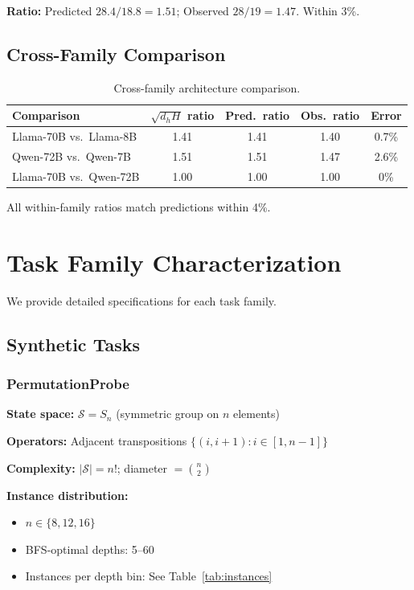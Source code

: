 \documentclass{article}
\theoremstyle{plain}
\theoremstyle{definition}
\theoremstyle{remark}
\begin{document}
\textbf{Ratio:} Predicted $28.4/18.8 = 1.51$; Observed $28/19 = 1.47$. Within 3\%.

\subsection{Cross-Family Comparison}

\begin{table}[h]
\centering
\caption{Cross-family architecture comparison.}
\label{tab:cross_family}
\small
\begin{tabular}{@{}lcccc@{}}
\toprule
\textbf{Comparison} & $\sqrt{d_h H}$ ratio & \textbf{Pred.\ ratio} & \textbf{Obs.\ ratio} & \textbf{Error} \\
\midrule
Llama-70B vs.\ Llama-8B & 1.41 & 1.41 & 1.40 & 0.7\% \\
Qwen-72B vs.\ Qwen-7B & 1.51 & 1.51 & 1.47 & 2.6\% \\
Llama-70B vs.\ Qwen-72B & 1.00 & 1.00 & 1.00 & 0\% \\
\bottomrule
\end{tabular}
\end{table}

All within-family ratios match predictions within 4\%.


\section{Task Family Characterization}
\label{app:task_families}

We provide detailed specifications for each task family.

\subsection{Synthetic Tasks}

\subsubsection{PermutationProbe}

\textbf{State space:} $\mathcal{S} = S_n$ (symmetric group on $n$ elements)

\textbf{Operators:} Adjacent transpositions $\{(i, i+1) : i \in [1, n-1]\}$

\textbf{Complexity:} $|\mathcal{S}| = n!$; diameter $= \binom{n}{2}$

\textbf{Instance distribution:}
\begin{itemize}
\item $n \in \{8, 12, 16\}$
\item BFS-optimal depths: 5--60
\item Instances per depth bin: See Table~\ref{tab:instances}
\end{itemize}
\end{document}
